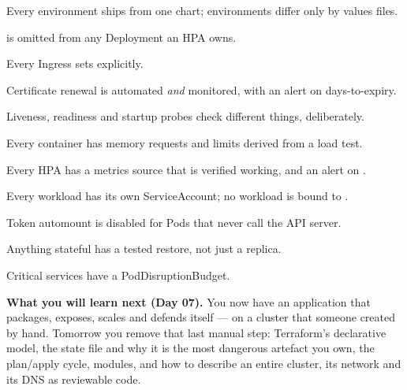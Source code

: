 \begin{checklist}
  \item Every environment ships from one chart; environments differ only by values files.
  \item {} is omitted from any Deployment an HPA owns.
  \item Every Ingress sets  explicitly.
  \item Certificate renewal is automated \emph{and} monitored, with an alert on days-to-expiry.
  \item Liveness, readiness and startup probes check different things, deliberately.
  \item Every container has memory requests and limits derived from a load test.
  \item Every HPA has a metrics source that is verified working, and an alert on .
  \item Every workload has its own ServiceAccount; no workload is bound to .
  \item Token automount is disabled for Pods that never call the API server.
  \item Anything stateful has a tested restore, not just a replica.
  \item Critical services have a PodDisruptionBudget.
\end{checklist}

\begin{keyidea}
\textbf{What you will learn next (Day 07).} You now have an application that packages, exposes, scales and defends itself --- on a cluster that someone created by hand. Tomorrow you remove that last manual step: Terraform's declarative model, the state file and why it is the most dangerous artefact you own, the plan/apply cycle, modules, and how to describe an entire cluster, its network and its DNS as reviewable code.
\end{keyidea}
